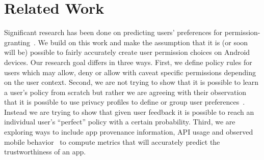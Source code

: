 \section{Related Work}
\label{RelatedWork}

\noindent
Significant research has been done on predicting users' preferences for permission-granting~\cite{Benisch2011,Sadeh2009,lin2014soups,liu2014www}.  We build on this work and make the assumption that it is (or soon will be) possible to fairly accurately create user permission choices on Android devices. Our research goal differs in three ways. First, we define policy rules for users which may allow, deny or allow with caveat specific permissions depending on the user context. Second, we are not trying to show that it is possible to learn a user's policy from scratch but rather we are agreeing with their observation that it is possible to use privacy profiles to define or group user preferences~\cite{liu2014www}. Instead we are trying to show that given user feedback it is possible to reach an individual user's ``perfect'' policy with a certain probability. Third, we are exploring ways to include app provenance information, API usage and observed mobile behavior~\cite{enck2010taintdroid} to compute metrics that will accurately predict the trustworthiness of an app.

